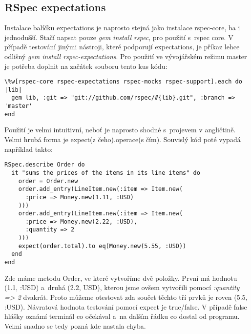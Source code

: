 \subsection{RSpec expectations}
\par Instalace balíčku expectations je naprosto stejná jako instalace rspec-core, ba i jednodušší. Stačí napsat pouze \textit{gem install rspec}, pro použití s~rspec core. V případě testování jinými nástroji, které podporují expectations, je příkaz lehce odlišný \textit{gem install rspec-expectations}. Pro použití ve vývojářském režimu master je potřeba doplnit na začátek souboru tento kus kódu:
\begin{verbatim}
\%w[rspec-core rspec-expectations rspec-mocks rspec-support].each do |lib|
  gem lib, :git => "git://github.com/rspec/#{lib}.git", :branch => 'master'
end
\end{verbatim}
\par Použití je velmi intuitivní, neboť je naprosto shodné s~projevem v angličtině. Velmi hrubá forma je expect(z čeho).operace(s čím). Souvislý kód poté vypadá například takto:
\begin{verbatim}
RSpec.describe Order do
  it "sums the prices of the items in its line items" do
    order = Order.new
    order.add_entry(LineItem.new(:item => Item.new(
      :price => Money.new(1.11, :USD)
    )))
    order.add_entry(LineItem.new(:item => Item.new(
      :price => Money.new(2.22, :USD),
      :quantity => 2
    )))
    expect(order.total).to eq(Money.new(5.55, :USD))
  end
end
\end{verbatim}
\par Zde máme metodu Order, ve které vytvoříme dvě položky. První má hodnotu (1.1, :USD) a~druhá (2.2, USD), kterou jsme ovšem vytvořili pomocí \textit{:quantity => 2} dvakrát. Proto můžeme otestovat zda součet těchto tří prvků je roven (5.5, :USD). Návratová hodnota testování pomocí expect je true/false. V případě false hlášky oznámí terminál co očekával a~na dalším řádku co dostal od programu. Velmi snadno se tedy pozná kde nastala chyba.


